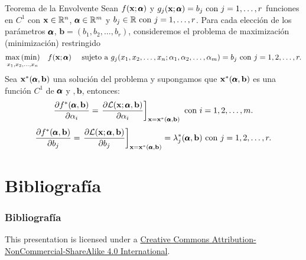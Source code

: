 \documentclass[10pt,aspectratio=169]{beamer}  %
\begin{document}
\begin{frame}{Teorema de la Envolvente}
	Sean $f(\mathbf{x};\pmb{\alpha})$ y $g_j(\mathbf{x}; \pmb{\alpha}) = b_j \text{ con } j= 1, \dots, r$ funciones en $C^1$ 
	con $\mathbf{x} \in \mathbb{R}^n$, $\pmb{\alpha} \in \mathbb{R}^m$ y $b_j \in \mathbb{R} \text{ con } j= 1, \dots, r$. Para cada elección de 
    los parámetros $\pmb{\alpha}$, $\mathbf{b} = (b_1, b_2, \dots, b_r)$, consideremos el problema de maximización 
	(minimización) restringido
	\[
		\underset{x_1, x_2, \dots, x_n}{\max \, (\min)} \quad  f(\mathbf{x}; \pmb{\alpha}) \quad \text{ sujeto a }  g_j(x_1, x_2, \dots, x_n; \alpha_1, \alpha_2, \dots, \alpha_m) = b_j 
		\text{ con } j = 1, 2, \dots, r.
	\]
	Sea $\mathbf{x}^*(\pmb{\alpha}, \mathbf{b})$ una solución del problema y supongamos que $\mathbf{x}^*(\pmb{\alpha}, \mathbf{b})$ es una 
	función $C^1$ de $\pmb{\alpha}$ y $, \mathbf{b}$, entonces:
	\[ \frac{\partial f^*(\pmb{\alpha},\mathbf{b})}{\partial \alpha_i} = 
	\left. \frac{\partial \mathcal{L}(\mathbf{x}; \pmb{\alpha}, \mathbf{b})}{\partial \alpha_i} \right]_{\mathbf{x} = \mathbf{x}^*(\pmb{\alpha}, \mathbf{b})}
	\text{ con } i = 1, 2, \dots, m.
	\]
	\[ \frac{\partial f^*(\pmb{\alpha},\mathbf{b})}{\partial b_j} = 
	\left. \frac{\partial \mathcal{L}(\mathbf{x}; \pmb{\alpha}, \mathbf{b})}{\partial b_j} \right]_{\mathbf{x} = \mathbf{x}^*(\pmb{\alpha}, \mathbf{b})}
	= \lambda_{j}^{*}(\pmb{\alpha},\mathbf{b}) \text{ con } j = 1, 2, \dots, r.
	\]

\end{frame}


\section{Bibliografía}

\nocite{*}
\begin{frame}[allowframebreaks]
\frametitle{Bibliografía}
    {%
    
    
   }
\end{frame}


{
\begin{frame}[standout]
	This presentation is licensed under a
	\href{https://creativecommons.org/licenses/by-nc-sa/4.0/}{Creative Commons Attribution-NonCommercial-ShareAlike 4.0 International}.
	
	\begin{center}
		\ccbyncsa
	\end{center}
\end{frame}
}
\end{document}
